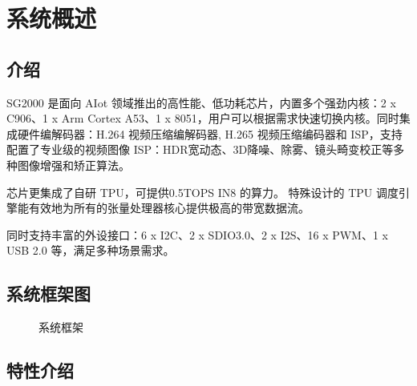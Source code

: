 \documentclass[letterpaper,10pt,english]{sphinxmanual}
\begin{document}
\sphinxstepscope


\chapter{系统概述}
\label{\detokenize{contents/system-overview/0.index:id1}}\label{\detokenize{contents/system-overview/0.index::doc}}
\sphinxstepscope


\section{介绍}
\label{\detokenize{contents/system-overview/introduction:id1}}\label{\detokenize{contents/system-overview/introduction::doc}}
\sphinxAtStartPar
SG2000 是面向 AIot 领域推出的高性能、低功耗芯片，内置多个强劲内核：2 x C906、1 x Arm Cortex A53、1 x 8051，用户可以根据需求快速切换内核。同时集成硬件编解码器：H.264 视频压缩编解码器, H.265 视频压缩编码器和 ISP，支持配置了专业级的视频图像 ISP：HDR宽动态、3D降噪、除雾、镜头畸变校正等多种图像增强和矫正算法。

\sphinxAtStartPar
芯片更集成了自研 TPU，可提供0.5TOPS IN8 的算力。 特殊设计的 TPU 调度引擎能有效地为所有的张量处理器核心提供极高的带宽数据流。

\sphinxAtStartPar
同时支持丰富的外设接口：6 x I2C、2 x SDIO3.0、2 x I2S、16 x PWM、1 x USB 2.0 等，满足多种场景需求。

\sphinxstepscope


\section{系统框架图}
\label{\detokenize{contents/system-overview/system-block-diagram:id1}}\label{\detokenize{contents/system-overview/system-block-diagram::doc}}
\begin{figure}[htbp]
\centering
\capstart

\noindent{}
\caption{系统框架}\label{\detokenize{contents/system-overview/system-block-diagram:id2}}\label{\detokenize{contents/system-overview/system-block-diagram:diagram-system-block}}\end{figure}

\sphinxstepscope


\section{特性介绍}
\label{\detokenize{contents/system-overview/features:id1}}\label{\detokenize{contents/system-overview/features::doc}}
\end{document}
